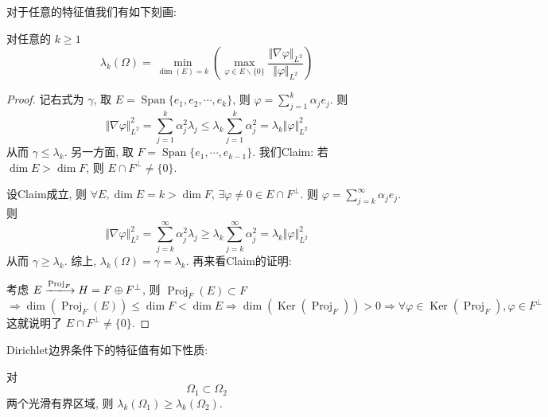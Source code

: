 \documentclass[11pt]{ctexart}[UTF8]
\begin{document}
对于任意的特征值我们有如下刻画:
\begin{proposition}
    对任意的 $k \geq 1$
    \begin{equation*}
        \lambda_{k}(\Omega) = \min\limits_{\dim(E) = k}\left( \max\limits_{\varphi \in E\backslash\{ 0\}} \frac{\Vert \nabla \varphi \Vert_{L^2}}{\Vert \varphi \Vert_{L^2}} \right)
    \end{equation*}
\end{proposition}
\begin{proof}
    记右式为 $\gamma$, 取 $E = \operatorname{Span}\{ e_{1}, e_{2}, \cdots, e_{k} \}$, 则 $\varphi = \sum\limits_{j=1}^{k} \alpha_j e_j$. 则
    \begin{equation*}
        \Vert \nabla \varphi \Vert_{L^2}^2 = \sum\limits_{j=1}^{k} \alpha_j^2 \lambda_j \leq \lambda_k \sum\limits_{j=1}^{k} \alpha_j^2 = \lambda_k \Vert \varphi \Vert_{L^2}^2
    \end{equation*}
    从而 $\gamma \leq \lambda_k$. 另一方面, 取 $F = \operatorname{Span}\{ e_{1},\cdots,e_{k-1} \}$. 我们Claim: 若 $\dim E > \dim F$, 则 $E \cap F^{\perp} \neq \{0\}$.\par
    设Claim成立, 则 $\forall E, \dim E = k > \dim F$, $\exists \varphi \neq 0 \in E \cap F^{\perp}$. 则 $\varphi = \sum\limits_{j=k}^{\infty} \alpha_j e_j$. 则
    \begin{equation*}
        \Vert \nabla \varphi \Vert_{L^2}^2 = \sum\limits_{j=k}^{\infty} \alpha_j^2 \lambda_j \geq \lambda_k \sum\limits_{j=k}^{\infty} \alpha_j^2 = \lambda_k \Vert \varphi \Vert_{L^2}^2
    \end{equation*}
    从而 $\gamma \geq \lambda_k$. 综上, $\lambda_{k}(\Omega) = \gamma = \lambda_k$.
    再来看Claim的证明: \par
    考虑 $E \xlongrightarrow{\operatorname{Proj}_{F}}H = F \oplus F^{\perp}$, 则 $\operatorname{Proj}_F(E) \subset F$
    \begin{equation*}
        \Longrightarrow \dim(\operatorname{Proj}_F(E)) \leq \dim F < \dim E \Longrightarrow \dim (\operatorname{Ker}(\operatorname{Proj}_F)) >0 \Longrightarrow \forall \varphi \in \operatorname{Ker}(\operatorname{Proj}_F), \varphi \in F^{\perp}
    \end{equation*}
    这就说明了 $E \cap F^{\perp} \neq \{0\}$.
\end{proof}
Dirichlet边界条件下的特征值有如下性质:
\begin{proposition}
    对 $$\Omega_1 \subset \Omega_2$$ 两个光滑有界区域, 则 $\lambda_k(\Omega_1) \geq \lambda_k(\Omega_2)$.
\end{proposition}
\end{document}
